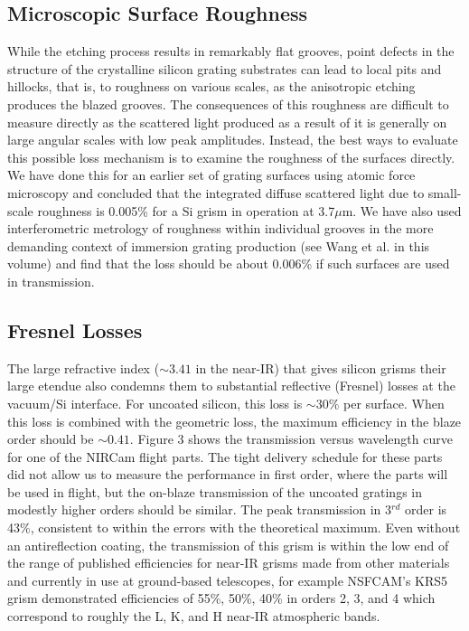 \subsection{Microscopic Surface Roughness}
While the etching process results in remarkably flat grooves, point defects in the structure of the crystalline silicon grating substrates can lead to local pits and hillocks, that is, to roughness on various scales, as the anisotropic etching produces the blazed grooves.  The consequences of this roughness are difficult to measure directly as the scattered light produced as a result of it is generally on large angular scales with low peak amplitudes.  Instead, the best ways to evaluate this possible loss mechanism is to examine the roughness of the surfaces directly.  We have done this for an earlier set of grating surfaces using atomic force microscopy\cite{Marsh07} and concluded that the integrated diffuse scattered light due to small-scale roughness is 0.005\% for a Si grism in operation at 3.7$\mu$m.  We have also used interferometric metrology of roughness within individual grooves in the more demanding context of immersion grating production (see Wang et al. in this volume\cite{Wang10}) and find that the loss should be about 0.006\%  if such surfaces are used in transmission.


\subsection{Fresnel Losses}
The large refractive index ($\sim 3.41$ in the near-IR) that gives silicon grisms their large etendue also condemns them to substantial reflective (Fresnel) losses at the vacuum/Si interface.  For uncoated silicon, this loss is $\sim 30\%$ per surface.  When this loss is combined with the geometric loss, the maximum efficiency in the blaze order should be $\sim 0.41$.  Figure 3 shows the transmission versus wavelength curve for one of the NIRCam flight parts.  The tight delivery schedule for these parts did not allow us to measure the performance in first order, where the parts will be used in flight, but the on-blaze transmission of the uncoated gratings in modestly higher orders should be similar.  The peak transmission in 3$^{rd}$ order is 43\%, consistent to within the errors with the theoretical maximum. Even without an antireflection coating, the transmission of this grism is within the low end of the range of published efficiencies for near-IR grisms made from other materials and currently in use at ground-based telescopes, for example NSFCAM's KRS5 grism\cite{Rayner98} demonstrated  efficiencies of 55\%, 50\%, 40\% in orders 2, 3, and 4 which correspond to roughly the L, K, and H near-IR atmospheric bands.  

